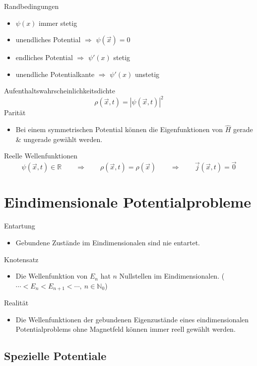 Randbedingungen \cite[Kap. 4.1.2]{qm}
\begin{itemize}
    \item $\psi(x)$ immer stetig
    \item unendliches Potential $\Rightarrow$ $\psi(\vec{x})=0$
    \item endliches Potential $\Rightarrow$ $\psi'(x)$ stetig
    \item unendliche Potentialkante $\Rightarrow$ $\psi'(x)$ unstetig
\end{itemize}
Aufenthaltswahrscheinlichkeitsdichte \cite[Glg. A.97]{qm}
\begin{equation*}
	\rho(\vec{x}, t) = |\psi(\vec{x}, t)|^2
\end{equation*}
Parität \cite[S. 105]{qm}
\begin{itemize}
    \item Bei einem symmetrischen Potential können die Eigenfunktionen von $\hat{H}$ gerade \& ungerade gewählt werden.
\end{itemize}
Reelle Wellenfunktionen \cite[S. 111]{qm}
\begin{equation*}
	\psi(\vec{x},t)\in\mathbb{R} \qquad \Rightarrow \qquad \rho(\vec{x},t)=\rho(\vec{x}) \qquad \Rightarrow \qquad \vec{j}(\vec{x},t)=\vec{0}
\end{equation*}

\section{Eindimensionale Potentialprobleme}

Entartung \cite[Kap. 4.6.3]{qm}
\begin{itemize}
    \item Gebundene Zustände im Eindimensionalen sind nie entartet.
\end{itemize}
Knotensatz \cite[Kap. 4.6.4]{qm}
\begin{itemize}
    \item Die Wellenfunktion von $E_n$ hat $n$ Nullstellen im Eindimensionalen. ($\cdots<E_n<E_{n+1}<\cdots, \ n\in\mathbb{N}_0$)
\end{itemize}
Realität \cite[Kap. 4.6.5]{qm}
\begin{itemize}
    \item Die Wellenfunktionen der gebundenen Eigenzustände eines eindimensionalen Potentialproblems ohne Magnetfeld können immer reell gewählt werden.
\end{itemize}

\subsection{Spezielle Potentiale}

